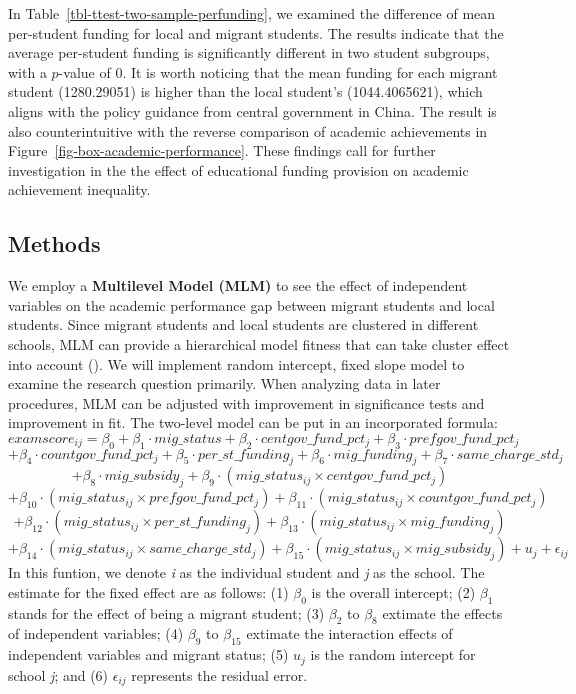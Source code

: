 \documentclass[
  man,
  floatsintext,
  longtable,
  nolmodern,
  notxfonts,
  notimes,
  colorlinks=true,linkcolor=blue,citecolor=blue,urlcolor=blue]{apa7}
\begin{document}
In Table~\ref{tbl-ttest-two-sample-perfunding}, we examined the
difference of mean per-student funding for local and migrant students.
The results indicate that the average per-student funding is
significantly different in two student subgroups, with a \(p\)-value of
0. It is worth noticing that the mean funding for each migrant student
(1280.29051) is higher than the local student's (1044.4065621), which
aligns with the policy guidance from central government in China. The
result is also counterintuitive with the reverse comparison of academic
achievements in Figure~\ref{fig-box-academic-performance}. These
findings call for further investigation in the the effect of educational
funding provision on academic achievement inequality.

\subsection{Methods}\label{methods}

We employ a \textbf{Multilevel Model (MLM)} to see the effect of
independent variables on the academic performance gap between migrant
students and local students. Since migrant students and local students
are clustered in different schools, MLM can provide a hierarchical model
fitness that can take cluster effect into account
(). We will implement random intercept, fixed slope model to examine
the research question primarily. When analyzing data in later
procedures, MLM can be adjusted with improvement in significance tests
and improvement in fit. The two-level model can be put in an
incorporated formula:
\[ examscore_{ij}= \beta_0 + \beta_1 \cdot mig\_status + \beta_2 \cdot centgov\_fund\_pct_j + \beta_3 \cdot prefgov\_fund\_pct_j \]
\[+\beta_4 \cdot countgov\_fund\_pct_j + \beta_5 \cdot per\_st\_funding_j + \beta_6 \cdot mig\_funding_j + \beta_7 \cdot same\_charge\_std_j\]
\[ + \beta_8 \cdot mig\_subsidy_j  + \beta_9 \cdot (mig\_status_{ij} \times centgov\_fund\_pct_j) \]
\[ + \beta_{10} \cdot (mig\_status_{ij} \times prefgov\_fund\_pct_j) + \beta_{11} \cdot (mig\_status_{ij} \times countgov\_fund\_pct_j) \]
\[ + \beta_{12} \cdot (mig\_status_{ij} \times per\_st\_funding_j)  + \beta_{13} \cdot (mig\_status_{ij} \times mig\_funding_j) \]
\[ + \beta_{14} \cdot (mig\_status_{ij} \times same\_charge\_std_j)  + \beta_{15} \cdot (mig\_status_{ij} \times mig\_subsidy_j) + u_j + \epsilon_{ij} \]
In this funtion, we denote \emph{i} as the individual student and
\emph{j} as the school. The estimate for the fixed effect are as
follows: (1) \(\beta_0\) is the overall intercept; (2) \(\beta_1\)
stands for the effect of being a migrant student; (3) \(\beta_2\) to
\(\beta_8\) extimate the effects of independent variables; (4)
\(\beta_9\) to \(\beta_15\) extimate the interaction effects of
independent variables and migrant status; (5) \(u_j\) is the random
intercept for school \emph{j}; and (6) \(\epsilon_{ij}\) represents the
residual error.
\end{document}
